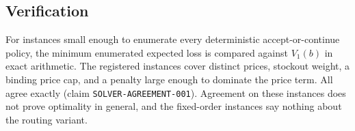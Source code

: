 \subsection{Verification}

For instances small enough to enumerate every deterministic accept-or-continue
policy, the minimum enumerated expected loss is compared against $V_1(b)$ in exact
arithmetic. The registered instances cover distinct prices, stockout weight, a
binding price cap, and a penalty large enough to dominate the price term. All
\ResultSolverCasesVerified{} agree exactly (claim \texttt{SOLVER-AGREEMENT-001}).
Agreement on these instances does not prove optimality in general, and the
fixed-order instances say nothing about the routing variant.
